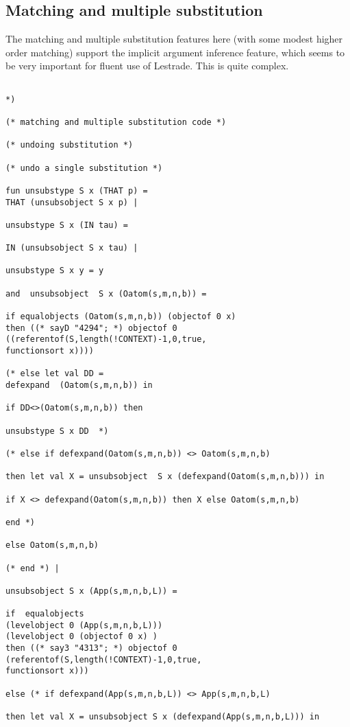 \documentclass[12pt]{article}
\begin{document}
\newpage

\subsection{Matching and multiple substitution}

The matching and multiple substitution features here (with some modest higher order matching) support the implicit argument inference feature, which seems to be very
important for fluent use of Lestrade.  This is quite complex.

\begin{verbatim}

*)

(* matching and multiple substitution code *)

(* undoing substitution *)

(* undo a single substitution *)

fun unsubstype S x (THAT p) =
THAT (unsubsobject S x p) |

unsubstype S x (IN tau) =

IN (unsubsobject S x tau) |

unsubstype S x y = y

and  unsubsobject  S x (Oatom(s,m,n,b)) =

if equalobjects (Oatom(s,m,n,b)) (objectof 0 x) 
then ((* sayD "4294"; *) objectof 0 ((referentof(S,length(!CONTEXT)-1,0,true,
functionsort x))))

(* else let val DD = 
defexpand  (Oatom(s,m,n,b)) in 

if DD<>(Oatom(s,m,n,b)) then 

unsubstype S x DD  *)

(* else if defexpand(Oatom(s,m,n,b)) <> Oatom(s,m,n,b)

then let val X = unsubsobject  S x (defexpand(Oatom(s,m,n,b))) in

if X <> defexpand(Oatom(s,m,n,b)) then X else Oatom(s,m,n,b)

end *)

else Oatom(s,m,n,b)

(* end *) |

unsubsobject S x (App(s,m,n,b,L)) =

if  equalobjects 
(levelobject 0 (App(s,m,n,b,L))) 
(levelobject 0 (objectof 0 x) )
then ((* say3 "4313"; *) objectof 0 (referentof(S,length(!CONTEXT)-1,0,true,
functionsort x)))

else (* if defexpand(App(s,m,n,b,L)) <> App(s,m,n,b,L)

then let val X = unsubsobject S x (defexpand(App(s,m,n,b,L))) in


\end{verbatim}
\end{document}
